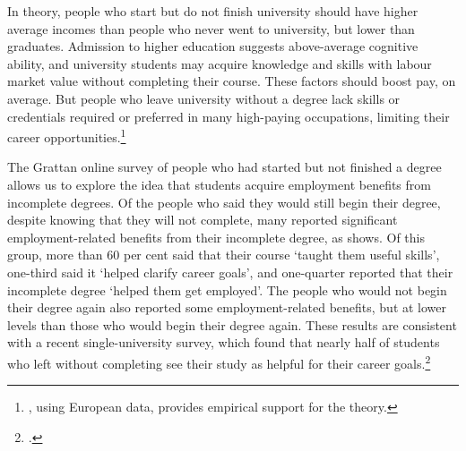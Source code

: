 In theory, people who start but do not finish university should have higher average incomes than people who never went to university, but lower than graduates. Admission to higher education suggests above-average cognitive ability, and university students may acquire knowledge and skills with labour market value without completing their course. These factors should boost pay, on average. But people who leave university without a degree lack skills or credentials required or preferred in many high-paying occupations, limiting their career opportunities.\footnote{\textcite{Schnepf2017}, using European data, provides empirical support for the theory.}

The Grattan online survey of people who had started but not finished a degree allows us to explore the idea that students acquire employment benefits from incomplete degrees. Of the people who said they would still begin their degree, despite knowing that they will not complete, many reported significant employment-related benefits from their incomplete degree, as  shows. Of this group, more than 60 per cent said that their course `taught them useful skills', one-third said it `helped clarify career goals', and one-quarter reported that their incomplete degree `helped them get employed'. The people who would not begin their degree again also reported some employment-related benefits, but at lower levels than those who would begin their degree again. These results are consistent with a recent single-university survey, which found that nearly half of students who left without completing see their study as helpful for their career goals.\footcite[][37]{Harvey2017a}


